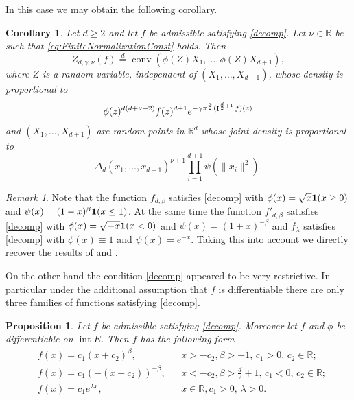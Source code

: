 \documentclass[11pt,a4paper]{article}
\theoremstyle{plain}
\newtheorem{corollary}[theorem]{Corollary}
\newtheorem{proposition}[theorem]{Proposition}
\theoremstyle{definition}
\theoremstyle{remark}
\newtheorem{remark}[theorem]{Remark}
\def\RR{\mathbb{R}}
\newcommand{\conv}{\mathop{\mathrm{conv}}\nolimits}
\newcommand{\frI}{\mathop{\mathrm{I}}\nolimits}
\newcommand{\inter}{\operatorname{int}}
\begin{document}
In this case we may obtain the following corollary.

\begin{corollary}\label{cor:decomposition}
    Let $d\ge 2$ and let $f$ be admissible satisfying \eqref{decomp}. Let $\nu\in \RR$ be such that \eqref{eq:FiniteNormalizationConst} holds. Then
    \[
        Z_{d,\gamma,\nu}(f)\overset{d}{=}\conv(\phi(Z)X_1,\ldots,\phi(Z)X_{d+1}),
    \]
    where $Z$ is a random variable, independent of $(X_1,\ldots,X_{d+1})$, whose density is proportional to
    \[
        \phi(z)^{d(d+\nu+2)}f(z)^{d+1}e^{-\gamma\pi^{d\over 2}(\frI^{{d\over 2}+1}f)(z)}
    \]
    and  $(X_1,\ldots,X_{d+1})$ are random points in $\RR^d$ whose joint density is proportional to
    \[
        \Delta_d(x_1,\ldots,x_{d+1})^{\nu+1}\prod_{i=1}^{d+1}\psi(\|x_i\|^2).
    \]
\end{corollary}

\begin{remark}\label{rmk:decomposition}
    Note that the function $f_{d,\beta}$ satisfies \eqref{decomp} with $\phi(x)=\sqrt{x}{\bf 1}(x\ge 0)$ and $\psi(x)=(1-x)^{\beta}{\bf 1}(x\leq 1)$. At the same time the function $f'_{d,\beta}$ satisfies \eqref{decomp} with $\phi(x)=\sqrt{-x}{\bf 1}(x<0)$ and $\psi(x)=(1+x)^{-\beta}$ and $\widetilde f_{\lambda}$ satisfies \eqref{decomp} with $\phi(x)\equiv 1$ and $\psi(x)=e^{-x}$. Taking this into account we directly recover the results of \cite[Theorem 4.5]{GKT20} and \cite[Theorem 5.1]{GKT21}.
\end{remark}

On the other hand the condition \eqref{decomp} appeared to be very restrictive. In particular under the additional assumption that $f$ is differentiable there are only three families of functions satisfying \eqref{decomp}.

\begin{proposition}\label{lm:decomp}
    Let $f$ be admissible satisfying \eqref{decomp}. Moreover let $f$ and $\phi$ be differentiable on $\inter E$. Then $f$ has the following form 
    \begin{align}
        &f(x)= c_1(x+c_2)^\beta, &&x> -c_2, \beta > -1,\, c_1 > 0,\, c_2 \in \RR; \label{eq:BetaCase}\\
        &f(x)=c_1(-(x+c_2))^{-\beta}, &&x < -c_2, \beta > \frac{d}{2}+1,\, c_1 < 0,\, c_2 \in \RR;\label{eq:BetaPrimeCase}\\
        &f(x)=c_1e^{\lambda x}, &&x \in \RR, c_1>0,\, \lambda > 0.\label{eq:GaussianCase}
    \end{align}
\end{proposition}
\end{document}
